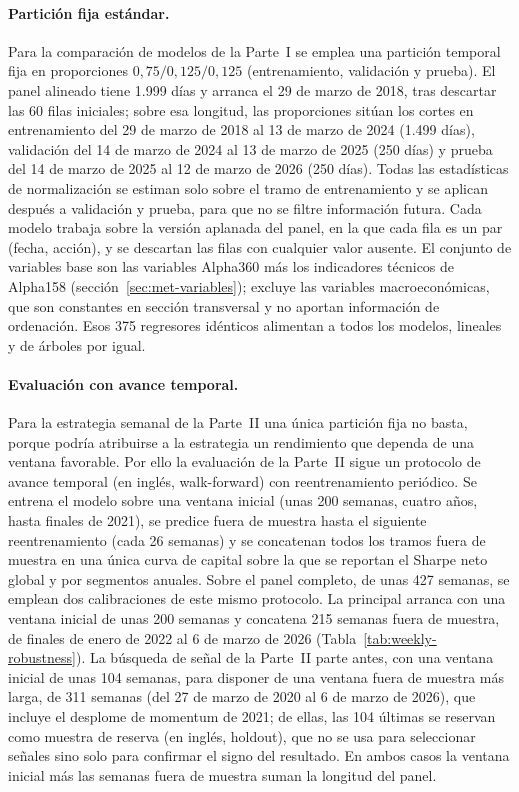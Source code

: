 \paragraph{Partición fija estándar.} Para la comparación de modelos de la Parte~I se
emplea una partición temporal fija en proporciones \(0{,}75/0{,}125/0{,}125\)
(entrenamiento, validación y prueba). El panel alineado tiene 1.999 días y arranca el 29
de marzo de 2018, tras descartar las 60 filas iniciales; sobre esa longitud, las
proporciones sitúan los cortes en entrenamiento del 29 de marzo de 2018 al 13 de marzo de
2024 (1.499 días), validación del 14 de marzo de 2024 al 13 de marzo de 2025 (250 días) y
prueba del 14 de marzo de 2025 al 12 de marzo de 2026 (250 días). Todas las estadísticas
de normalización se estiman solo sobre el tramo de entrenamiento y se aplican después a
validación y prueba, para que no se filtre información futura. Cada modelo trabaja sobre
la versión aplanada del panel, en la que cada fila es un par (fecha, acción), y se
descartan las filas con cualquier valor ausente. El conjunto de variables base son las
variables Alpha360 más los indicadores técnicos de Alpha158
(sección~\ref{sec:met-variables}); excluye las variables macroeconómicas, que son
constantes en sección transversal y no aportan información de ordenación. Esos 375
regresores idénticos alimentan a todos los modelos, lineales y de árboles por igual.

\paragraph{Evaluación con avance temporal.} Para la estrategia semanal de la Parte~II una
única partición fija no basta, porque podría atribuirse a la estrategia un rendimiento que
dependa de una ventana favorable. Por ello la evaluación de la Parte~II sigue un protocolo
de avance temporal (en inglés, walk-forward) con reentrenamiento periódico. Se entrena el
modelo sobre una ventana inicial (unas 200 semanas, cuatro años, hasta finales de 2021),
se predice fuera de muestra hasta el siguiente reentrenamiento (cada 26 semanas) y se
concatenan todos los tramos fuera de muestra en una única curva de capital sobre la que se
reportan el Sharpe neto global y por segmentos anuales. Sobre el panel completo, de unas
427 semanas, se emplean dos calibraciones de este mismo protocolo. La principal arranca
con una ventana inicial de unas 200 semanas y concatena 215 semanas fuera de muestra, de
finales de enero de 2022 al 6 de marzo de 2026 (Tabla~\ref{tab:weekly-robustness}). La
búsqueda de señal de la Parte~II parte antes, con una ventana inicial de unas 104 semanas,
para disponer de una ventana fuera de muestra más larga, de 311 semanas (del 27 de marzo
de 2020 al 6 de marzo de 2026), que incluye el desplome de momentum de 2021; de ellas, las
104 últimas se reservan como muestra de reserva (en inglés, holdout), que no se usa para
seleccionar señales sino solo para confirmar el signo del resultado. En ambos casos la
ventana inicial más las semanas fuera de muestra suman la longitud del panel.


